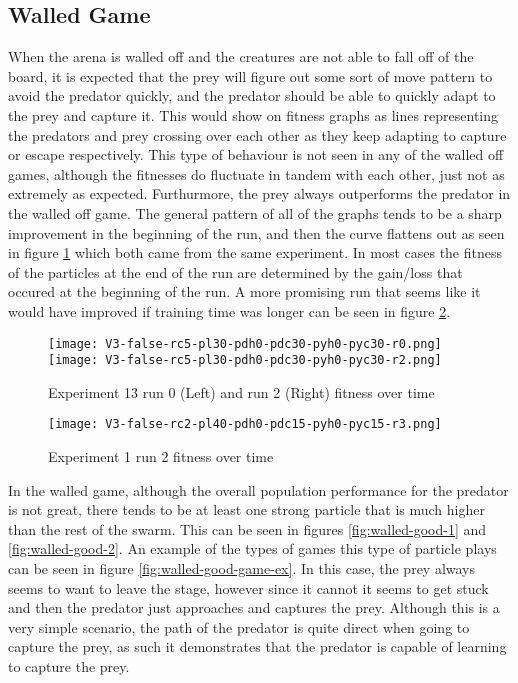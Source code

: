 \subsection{Walled Game}

When the arena is walled off and the creatures are not able to fall off of the board, it is expected that the prey will figure out some sort of move pattern to avoid the predator quickly, and the predator should be able to quickly adapt to the prey and capture it. This would show on fitness graphs as lines representing the predators and prey crossing over each other as they keep adapting to capture or escape respectively. This type of behaviour is not seen in any of the walled off games, although the fitnesses do fluctuate in tandem with each other, just not as extremely as expected. Furthurmore, the prey always outperforms the predator in the walled off game. The general pattern of all of the graphs tends to be a sharp improvement in the beginning of the run, and then the curve flattens out as seen in figure \ref{fig:wall-exp-1} which both came from the same experiment. In most cases the fitness of the particles at the end of the run are determined by the gain/loss that occured at the beginning of the run. A more promising run that seems like it would have improved if training time was longer can be seen in figure \ref{fig:walled-better-run}. 

\begin{figure}
  \centering
  \texttt{[image: V3-false-rc5-pl30-pdh0-pdc30-pyh0-pyc30-r0.png]}  \texttt{[image: V3-false-rc5-pl30-pdh0-pdc30-pyh0-pyc30-r2.png]}
  \caption{Experiment 13 run 0 (Left) and run 2 (Right) fitness over time}
  \label{fig:wall-exp-1}
\end{figure}

\begin{figure}
  
   \centering
  \texttt{[image: V3-false-rc2-pl40-pdh0-pdc15-pyh0-pyc15-r3.png]}  
  \caption{Experiment 1 run 2 fitness over time}
  \label{fig:walled-better-run}
  
\end{figure}

In the walled game, although the overall population performance for the predator is not great, there tends to be at least one strong particle that is much higher than the rest of the swarm. This can be seen in figures \ref{fig:walled-good-1} and \ref{fig:walled-good-2}. An example of the types of games this type of particle plays can be seen in figure \ref{fig:walled-good-game-ex}. In this case, the prey always seems to want to leave the stage, however since it cannot it seems to get stuck and then the predator just approaches and captures the prey. Although this is a very simple scenario, the path of the predator is quite direct when going to capture the prey, as such it demonstrates that the predator is capable of learning to capture the prey.


